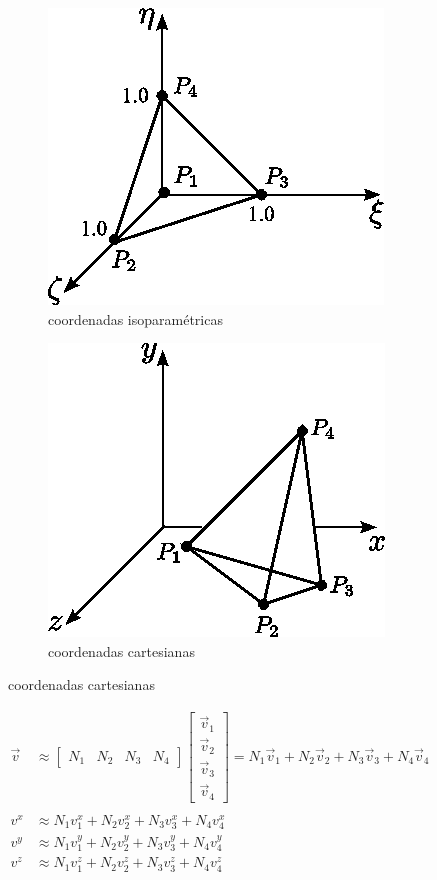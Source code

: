 \documentclass[12pt]{article}
\newcommand{\vv}{\vec{v}}
\begin{document}
\begin{figure}
	\begin{subfigure}{.5\textwidth}
	  \centering
	  \includegraphics[width=.8\linewidth]{f1.png}
	  \caption{coordenadas isoparam\'etricas}
	\end{subfigure}%
	\begin{subfigure}{.5\textwidth}
	  \centering
	  \includegraphics[width=.8\linewidth]{f2.png}
	  \caption{coordenadas cartesianas}
	\end{subfigure}
\end{figure}
\begin{align*}
\vv &\approx \begin{bmatrix} N_1 & N_2 & N_3 & N_4 \end{bmatrix} \begin{bmatrix} \vv_1 \\ \vv_2 \\ \vv_3 \\ \vv_4 \end{bmatrix} = N_1 \vv_1 + N_2 \vv_2 + N_3 \vv_3 + N_4 \vv_4 \\ \\
v^{x} &\approx N_1v^{x}_{1} +  N_2v^{x}_{2} +  N_3v^{x}_{3} +  N_4v^{x}_{4} \\
v^{y} &\approx N_1v^{y}_{1} +  N_2v^{y}_{2} +  N_3v^{y}_{3} +  N_4v^{y}_{4} \\
v^{z} &\approx N_1v^{z}_{1} +  N_2v^{z}_{2} +  N_3v^{z}_{3} +  N_4v^{z}_{4}
\end{align*}
\end{document}
